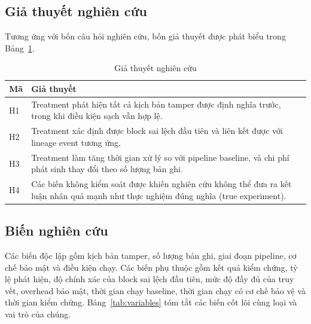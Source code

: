 \subsection{Giả thuyết nghiên cứu}\label{sec:giathuyet}

Tương ứng với bốn câu hỏi nghiên cứu, bốn giả thuyết được phát biểu
trong Bảng~\ref{tab:hypotheses}.

\begin{table}[!t]
\centering
\caption{Giả thuyết nghiên cứu}
\label{tab:hypotheses}
\begin{tabular}{|l|p{\dimexpr\columnwidth-1.2cm-6\tabcolsep\relax}|}
\hline
\textbf{Mã} & \textbf{Giả thuyết} \\
\hline
H1 & Treatment phát hiện tất cả kịch bản tamper được định nghĩa trước,
trong khi điều kiện sạch vẫn hợp lệ. \\
\hline
H2 & Treatment xác định được block sai lệch đầu tiên và liên kết được với
lineage event tương ứng. \\
\hline
H3 & Treatment làm tăng thời gian xử lý so với pipeline baseline, và
chi phí phát sinh thay đổi theo số lượng bản ghi. \\
\hline
H4 & Các biến không kiểm soát được khiến nghiên cứu không thể đưa ra kết
luận nhân quả mạnh như thực nghiệm đúng nghĩa (true experiment). \\
\hline
\end{tabular}
\end{table}
\subsection{Biến nghiên cứu}\label{sec:bienso}

Các biến độc lập gồm kịch bản tamper, số lượng bản ghi, giai đoạn pipeline,
cơ chế bảo mật và điều kiện chạy. Các biến phụ thuộc gồm kết quả kiểm chứng,
tỷ lệ phát hiện, độ chính xác của block sai lệch đầu tiên, mức độ đầy đủ
của truy vết, overhead bảo mật, thời gian chạy baseline, thời gian chạy có
cơ chế bảo vệ và thời gian kiểm chứng. Bảng~\ref{tab:variables} tóm tắt
các biến cốt lõi cùng loại và vai trò của chúng.

